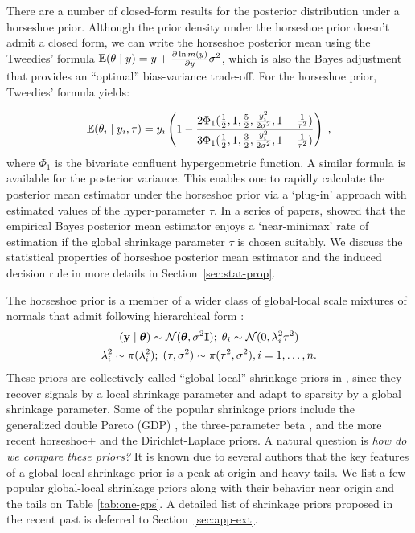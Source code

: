\documentclass[sts,preprint]{imsart}
\begin{document}
There are a number of closed-form results for the posterior distribution under a horseshoe prior. Although the prior density under the horseshoe prior doesn't admit a closed form, we can write the horseshoe posterior mean using the Tweedies' formula $\mathbb E(\theta \mid y) = y + \frac{\partial \ln m(y)}{\partial y}\sigma^2$, which is also
the Bayes adjustment that provides an ``optimal'' bias-variance trade-off. For the horseshoe prior, Tweedies' formula yields:

\begin{equation}
  \mathbb E(\theta_i \mid y_i, \tau) = y_i \left( 1 - \frac{2\Phi_1(\frac{1}{2}, 1,
  \frac{5}{2},\frac{y_i^2}{2\sigma^2}, 1-\frac{1}{\tau^2})}{
  3\Phi_1(\frac{1}{2}, 1, \frac{3}{2},\frac{y_i^2}{2\sigma^2}, 1-\frac{1}{\tau^2})} \right)
  \;,
\end{equation}
where $\Phi_1$ is the bivariate confluent hypergeometric function. A similar formula is available for the posterior variance. This enables one to rapidly calculate the posterior mean estimator under the
horseshoe prior via a `plug-in' approach with estimated values of the hyper-parameter $\tau$. In a series of papers, \citet{van2014horseshoe,van2015conditions,van2016many,van2017adaptive} showed that the empirical Bayes posterior mean
estimator enjoys  a `near-minimax' rate of estimation if the global shrinkage
parameter $\tau$ is chosen suitably. We discuss the statistical properties of
horseshoe posterior mean estimator and the induced decision rule in more
details in Section~\ref{sec:stat-prop}. 

%
The horseshoe prior is a member of a wider class of global-local scale mixtures of normals that admit following hierarchical form \citep{polson2010shrink}: 
\begin{gather*}
({\bf y} \mid \boldsymbol{\theta}) \sim {\cal N}(\boldsymbol{\theta}, \sigma^2 {\bf I}) ;\; \theta_i \sim {\cal N}(0, \lambda_i^2 \tau^2) \\
\lambda_i^2 \sim \pi(\lambda_i^2) ; \; (\tau,\sigma^2) \sim  \pi(\tau^2,\sigma^2), i = 1, \ldots, n. 
\end{gather*}
These priors are collectively called ``global-local'' shrinkage priors in
\cite{polson2010shrink}, since they recover signals by a local shrinkage
parameter and adapt to sparsity by a global shrinkage parameter. Some of the
popular shrinkage priors include the generalized double Pareto (GDP)
\citep{armagan2013generalized}, the three-parameter beta
\citep{armagan2011generalized}, and the more recent horseshoe+
\citep{bhadra2015horseshoe+} and the Dirichlet-Laplace
\citep{bhattacharya2014dirichlet} priors. A natural question is \textit{how do
we compare these priors?} It is known due to several authors
\citep[e.g.]{polson2010shrink,bhadra2015default,van2015conditions} that the key
features of a global-local shrinkage prior is a peak at origin and heavy tails.
We list a few popular global-local shrinkage priors along with their behavior near origin and the tails on Table \ref{tab:one-gps}. A detailed list of shrinkage priors
proposed in the recent past is deferred to Section~\ref{sec:app-ext}.
\end{document}
